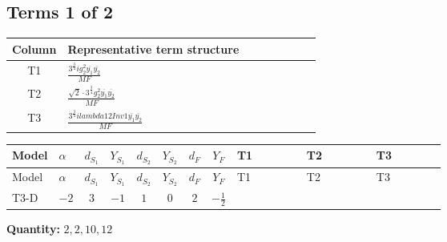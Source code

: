 \documentclass[8pt]{article}
\begin{document}
\begin{landscape}
\subsection*{Terms 1 of 2}
\begin{center}
\begin{tabular}{@{}c >{\raggedright\arraybackslash}p{0.82\linewidth}@{}}
\toprule
Column & Representative term structure \\
\midrule
T1 & \(\displaystyle \frac{3^{\frac{3}{4}} i g_{2}^{2} \overline{y_{1}} \overline{y_{2}}}{MF}\) \\
\midrule
T2 & \(\displaystyle \frac{\sqrt{2} \cdot 3^{\frac{3}{4}} g_{2}^{2} \overline{y_{1}} \overline{y_{2}}}{MF}\) \\
\midrule
T3 & \(\displaystyle \frac{3^{\frac{3}{4}} i lambda12Inv1 \overline{y_{1}} \overline{y_{2}}}{MF}\) \\
\midrule
\bottomrule
\end{tabular}
\end{center}
\smallskip
\tiny
\begin{longtable}{@{}llcccccc >{\raggedright\arraybackslash}p{0.21\linewidth} >{\raggedright\arraybackslash}p{0.21\linewidth} >{\raggedright\arraybackslash}p{0.21\linewidth}@{}}
\toprule
Model & $\alpha$ & $d_{S_1}$ & $Y_{S_1}$ & $d_{S_2}$ & $Y_{S_2}$ & $d_F$ & $Y_F$ & T1 & T2 & T3 \\
\midrule
\endfirsthead
\toprule
Model & $\alpha$ & $d_{S_1}$ & $Y_{S_1}$ & $d_{S_2}$ & $Y_{S_2}$ & $d_F$ & $Y_F$ & T1 & T2 & T3 \\
\midrule
\endhead
T3-D & $-2$ & $3$ & $-1$ & $1$ & $0$ & $2$ & $-\frac{1}{2}$ & \scriptsize\adjustbox{max width=\linewidth}{$\begin{gathered} - \frac{17 \cdot 3^{\frac{3}{4}} i g_{2}^{2} \overline{y_{1}} \overline{y_{2}}}{24 MF}\end{gathered}$} & \scriptsize\adjustbox{max width=\linewidth}{$\begin{gathered} - \frac{\sqrt{2} \cdot 3^{\frac{3}{4}} g_{2}^{2} \overline{y_{1}} \overline{y_{2}}}{3 MF}\end{gathered}$} & \scriptsize\adjustbox{max width=\linewidth}{$\begin{gathered} - \frac{3^{\frac{3}{4}} i lambda12Inv1 \overline{y_{1}} \overline{y_{2}}}{6 MF}\end{gathered}$} \\
\midrule
\bottomrule
\end{longtable}
\clearpage
\noindent\textbf{Quantity: }$\mathrm{2,2,10,12}$\par\smallskip

\end{landscape}
\end{document}
